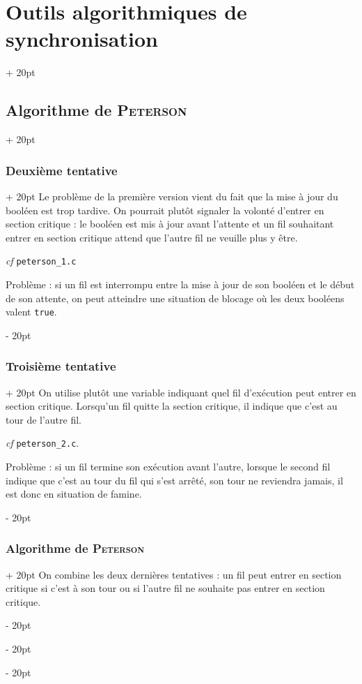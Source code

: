 \documentclass[a4paper, 12pt, twoside]{article}
\newcommand{\ind}[1][20pt]{\advance\leftskip + #1}
\newcommand{\deind}[1][20pt]{\advance\leftskip - #1}
\newenvironment{indt}[2][20pt]{#2 \par \ind[#1]}{\par \deind} %
\begin{document}
\begin{indt}{\section{Outils algorithmiques de synchronisation}}
\begin{indt}{\subsection{Algorithme de \textsc{Peterson}}}
            \vspace{12pt}
            
            \begin{indt}{\subsubsection{Deuxième tentative}}
                Le problème de la première version vient du fait que la mise à jour du booléen est trop tardive. On pourrait plutôt signaler la volonté d'entrer en section critique : le booléen est mis à jour avant l'attente et un fil souhaitant entrer en section critique attend que l'autre fil ne veuille plus y être.

                \textit{cf} \texttt{peterson\_1.c}

                \vspace{6pt}
                
                Problème : si un fil est interrompu entre la mise à jour de son booléen et le début de son attente, on peut atteindre une situation de blocage où les deux booléens valent \texttt{true}.
            \end{indt}

            \vspace{12pt}
            
            \begin{indt}{\subsubsection{Troisième tentative}}
                On utilise plutôt une variable indiquant quel fil d'exécution peut entrer en section critique.
                Lorsqu'un fil quitte la section critique, il indique que c'est au tour de l'autre fil.

                \textit{cf} \texttt{peterson\_2.c}.

                \vspace{6pt}
                
                Problème : si un fil termine son exécution avant l'autre, lorsque le second fil indique que c'est au tour du fil qui s'est arrêté, son tour ne reviendra jamais, il est donc en situation de famine.
            \end{indt}

            \vspace{12pt}
            
            \begin{indt}{\subsubsection{Algorithme de \textsc{Peterson}}}
                On combine les deux dernières tentatives : un fil peut entrer en section critique si c'est à son tour ou si l'autre fil ne souhaite pas entrer en section critique.


\end{indt}
\end{indt}
\end{indt}
\end{document}
